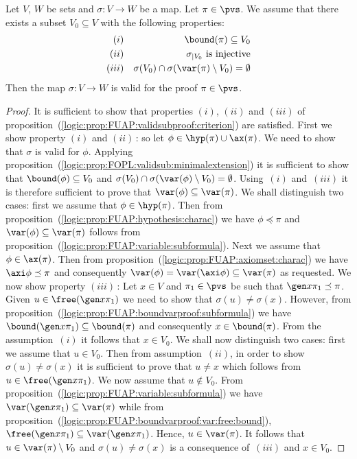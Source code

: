 \begin{prop}\label{logic:prop:FUAP:validsubproof:minimalextension}
Let $V$, $W$ be sets and $\sigma:V\to W$ be a map. Let $\pi\in\pvs$.
We assume that there exists a subset $V_{0}\subseteq V$ with the
following properties:
    \begin{eqnarray*}
    (i)&&\bound(\pi)\subseteq V_{0}\\
    (ii)&&\mbox{$\sigma_{|V_{0}}$ is injective}\\
    (iii)&&\sigma(V_{0})\cap\sigma(\var(\pi)\setminus
    V_{0})=\emptyset
    \end{eqnarray*}
Then the map $\sigma:V\to W$ is valid for the proof $\pi\in\pvs$.
\end{prop}
\begin{proof}
It is sufficient to show that properties $(i)$, $(ii)$ and $(iii)$
of proposition~(\ref{logic:prop:FUAP:validsubproof:criterion}) are
satisfied. First we show property $(i)$ and $(ii)$\,: so let
$\phi\in\hyp(\pi)\cup\ax(\pi)$. We need to show that $\sigma$ is
valid for $\phi$. Applying
proposition~(\ref{logic:prop:FOPL:validsub:minimalextension}) it is
sufficient to show that $\bound(\phi)\subseteq V_{0}$ and
$\sigma(V_{0})\cap\sigma(\var(\phi)\setminus V_{0})=\emptyset$.
Using~$(i)$ and~$(iii)$ it is therefore sufficient to prove that
$\var(\phi)\subseteq\var(\pi)$. We shall distinguish two cases:
first we assume that $\phi\in\hyp(\pi)$. Then from
proposition~(\ref{logic:prop:FUAP:hypothesis:charac}) we have
$\phi\preceq\pi$ and $\var(\phi)\subseteq\var(\pi)$ follows from
proposition~(\ref{logic:prop:FUAP:variable:subformula}). Next we
assume that $\phi\in\ax(\pi)$. Then from
proposition~(\ref{logic:prop:FUAP:axiomset:charac}) we have
$\axi\phi\preceq\pi$ and consequently
$\var(\phi)=\var(\axi\phi)\subseteq\var(\pi)$ as requested. We now
show property $(iii)$\,: Let $x\in V$ and $\pi_{1}\in\pvs$ be such
that $\gen x\pi_{1}\preceq\pi$. Given $u\in\free(\gen x\pi_{1})$ we
need to show that $\sigma(u)\neq\sigma(x)$. However, from
proposition~(\ref{logic:prop:FUAP:boundvarproof:subformula}) we have
$\bound(\gen x\pi_{1})\subseteq\bound(\pi)$ and consequently
$x\in\bound(\pi)$. From the assumption~$(i)$ it follows that $x\in
V_{0}$. We shall now distinguish two cases: first we assume that
$u\in V_{0}$. Then from assumption~$(ii)$, in order to show
$\sigma(u)\neq\sigma(x)$ it is sufficient to prove that $u\neq x$
which follows from $u\in\free(\gen x\pi_{1})$. We now assume that
$u\not\in V_{0}$. From
proposition~(\ref{logic:prop:FUAP:variable:subformula}) we have
$\var(\gen x\pi_{1})\subseteq\var(\pi)$ while from
proposition~(\ref{logic:prop:FUAP:boundvarproof:var:free:bound}),
$\free(\gen x\pi_{1})\subseteq\var(\gen x\pi_{1})$. Hence,
$u\in\var(\pi)$. It follows that $u\in\var(\pi)\setminus V_{0}$ and
$\sigma(u)\neq\sigma(x)$ is a consequence of~$(iii)$ and $x\in
V_{0}$.
\end{proof}
